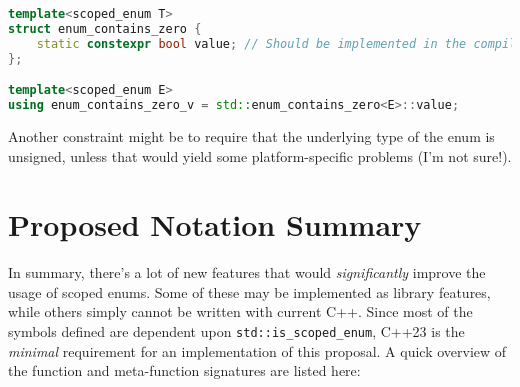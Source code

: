 \documentclass[
  format=manuscript,
  screen=true,
  review=false,
  nonacm=true,
  timestamp=true,
  balance=false]{acmart}
\newcommand{\beforecodespace}{\vspace{4mm}}
\begin{document}
\beforecodespace\begin{lstlisting}[language=Cpp]
template<scoped_enum T>
struct enum_contains_zero {
    static constexpr bool value; // Should be implemented in the compiler!
};

template<scoped_enum E>
using enum_contains_zero_v = std::enum_contains_zero<E>::value;
\end{lstlisting}

\noindent
Another constraint might be to require that the underlying type of the enum is
unsigned, unless that would yield some platform-specific problems (I'm not sure!).





\section{Proposed Notation Summary}
\label{proposed-notation-summary}

In summary, there's a lot of new features that would \textit{significantly} improve
the usage of scoped enums. Some of these may be implemented as library features,
while others simply cannot be written with current C++. Since most of the symbols
defined are dependent upon \texttt{std::is\_scoped\_enum}, C++23 is the
\textit{minimal} requirement for an implementation of this proposal. A quick overview
of the function and meta-function signatures are listed here:\vspace{2mm}
\end{document}
